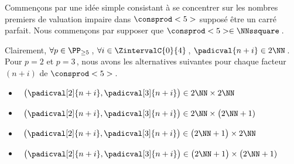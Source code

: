 Commençons par une idée simple consistant à se concentrer sur les nombres premiers de valuation impaire dans $\consprod<5>$ supposé être un carré parfait.
Nous commençons par supposer que $\consprod<5> \in \NNssquare$\,.
 
\smallskip

Clairement, 
$\forall p \in \PP_{\geq 5}$\,, 
$\forall i \in \ZintervalC{0}{4}$\,, 
$\padicval{n + i} \in 2 \NN$\,.
Pour $p = 2$ et $p = 3$\,, nous avons les alternatives suivantes pour chaque facteur $(n+i)$ de $\consprod<5>$\,.
%
\begin{itemize}
	\smallskip
	\item {}\,
	$\big( \padicval[2]{n + i} , \padicval[3]{n + i} \big) \in 2 \NN \times 2 \NN$

	\smallskip
	\item {}\,
	$\big( \padicval[2]{n + i} , \padicval[3]{n + i} \big) \in 2 \NN \times \big( 2 \NN + 1)$

	\smallskip
	\item {}\,
	$\big( \padicval[2]{n + i} , \padicval[3]{n + i} \big) \in \big( 2 \NN + 1 \big) \times 2 \NN$

	\smallskip
	\item {}\,
	$\big( \padicval[2]{n + i} , \padicval[3]{n + i} \big) \in \big( 2 \NN + 1 \big) \times \big( 2 \NN + 1)$
\end{itemize}

\medskip


